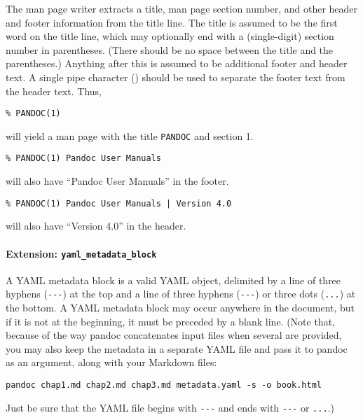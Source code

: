 \documentclass[]{article}
\let\oldparagraph\paragraph
\renewcommand{\paragraph}[1]{\oldparagraph{#1}\mbox{}}
\begin{document}
The man page writer extracts a title, man page section number, and other
header and footer information from the title line. The title is assumed
to be the first word on the title line, which may optionally end with a
(single-digit) section number in parentheses. (There should be no space
between the title and the parentheses.) Anything after this is assumed
to be additional footer and header text. A single pipe character
(\texttt{\textbar{}}) should be used to separate the footer text from
the header text. Thus,

\begin{verbatim}
% PANDOC(1)
\end{verbatim}

will yield a man page with the title \texttt{PANDOC} and section 1.

\begin{verbatim}
% PANDOC(1) Pandoc User Manuals
\end{verbatim}

will also have ``Pandoc User Manuals'' in the footer.

\begin{verbatim}
% PANDOC(1) Pandoc User Manuals | Version 4.0
\end{verbatim}

will also have ``Version 4.0'' in the header.

\hypertarget{extension-yaml_metadata_block}{\paragraph{\texorpdfstring{Extension:
\texttt{yaml\_metadata\_block}}{Extension: yaml\_metadata\_block}}\label{extension-yaml_metadata_block}}

A YAML metadata block is a valid YAML object, delimited by a line of
three hyphens (\texttt{-\/-\/-}) at the top and a line of three hyphens
(\texttt{-\/-\/-}) or three dots (\texttt{...}) at the bottom. A YAML
metadata block may occur anywhere in the document, but if it is not at
the beginning, it must be preceded by a blank line. (Note that, because
of the way pandoc concatenates input files when several are provided,
you may also keep the metadata in a separate YAML file and pass it to
pandoc as an argument, along with your Markdown files:

\begin{verbatim}
pandoc chap1.md chap2.md chap3.md metadata.yaml -s -o book.html
\end{verbatim}

Just be sure that the YAML file begins with \texttt{-\/-\/-} and ends
with \texttt{-\/-\/-} or \texttt{...}.)
\end{document}
